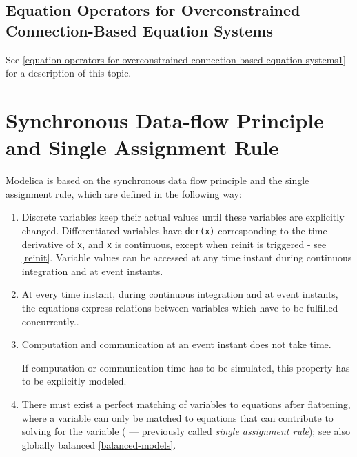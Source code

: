 \subsection{Equation Operators for Overconstrained Connection-Based Equation Systems}

See \autoref{equation-operators-for-overconstrained-connection-based-equation-systems1} for a description of this topic.

\section{Synchronous Data-flow Principle and Single Assignment Rule}

Modelica is based on the synchronous data flow principle and the single
assignment rule, which are defined in the following way:
\begin{enumerate}
\item Discrete variables keep their actual values until these variables are explicitly changed.
Differentiated variables have \lstinline!der(x)! corresponding to the time-derivative of \lstinline!x!,
and \lstinline!x! is continuous, except when reinit is triggered - see \autoref{reinit}.
Variable values can be accessed at any time instant during continuous integration and at event instants.

\item At every time instant, during continuous integration and at event instants,
the equations express relations between variables which have to be fulfilled concurrently..

\item Computation and communication at an event instant does not take time.
\begin{nonnormative}
If computation or communication time has to be simulated, this property has to be explicitly modeled.
\end{nonnormative}

\item There must exist a perfect matching of variables to equations after flattening, where a variable can only
be matched to equations that can contribute to solving for the variable
( --- previously called \emph{single assignment rule}); see also globally balanced \autoref{balanced-models}.
\end{enumerate}

